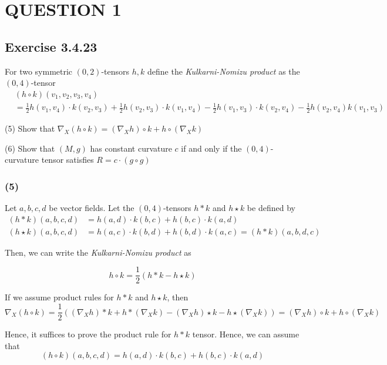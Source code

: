 \section{QUESTION 1}

\subsection{Exercise 3.4.23}

\begin{problem}[Exercise 3.4.23]
	For two symmetric  $(0, 2)$-tensors $h, k$ define the \textit{Kulkarni-Nomizu product} as the $(0, 4)$-tensor
	\begin{align*}
		&(h \circ k)(v_1, v_2, v_3, v_4) \\
		&= \frac{1}{2} h(v_1, v_4) \cdot k(v_2, v_3) + \frac{1}{2} h(v_2, v_3) \cdot k(v_1, v_4) - \frac{1}{2} h(v_1, v_3) \cdot k(v_2, v_4) - \frac{1}{2} h(v_2, v_4) k(v_1, v_3)
	\end{align*}
	
	(5) Show that $\nabla_X (h \circ k) = (\nabla_X h) \circ k + h \circ (\nabla_X k)$
	
	(6) Show that $(M, g)$ has constant curvature $c$ if and only if the $(0, 4)$-curvature tensor satisfies $R = c \cdot (g \circ g)$
\end{problem}

\subsubsection{(5)}

Let $a, b, c, d$ be vector fields. Let the $(0, 4)$-tensors $h * k$ and $h \star k$ be defined by
\begin{align*}
	(h * k) (a, b, c, d) &= h(a, d) \cdot k(b, c) + h(b, c)  \cdot k(a, d)  \\
	(h \star k) (a, b, c, d) &= h(a, c) \cdot k(b, d) + h(b, d) \cdot k(a, c) = (h * k) (a, b, d, c)
\end{align*}

Then, we can write the \textit{Kulkarni-Nomizu product} as

$$
	h \circ k = \frac{1}{2} (h*k - h \star k)
$$

If we assume product rules for $h * k$ and $h \star k$, then
$$
	\nabla_X (h \circ k) = \frac{1}{2} ((\nabla_X h) * k + h * (\nabla_X k) - (\nabla_X h) \star k - h \star (\nabla_X k)) = (\nabla_X h) \circ k + h \circ (\nabla_X k)
$$

Hence, it suffices to prove the product rule for $h * k$ tensor. Hence, we can assume that
$$
	(h \circ k) (a, b, c, d) = h(a, d) \cdot k(b, c) + h(b, c)  \cdot k(a, d)
$$

